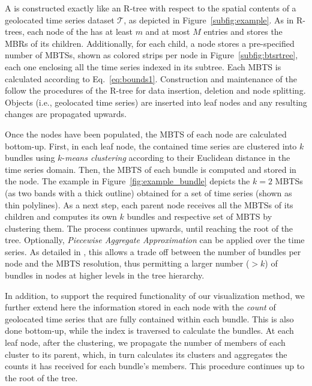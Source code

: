 A \btsr is constructed exactly like an R-tree \cite{Guttman1984} with respect to the spatial contents of a geolocated time series dataset $\mathcal{T}$, as depicted in Figure~\ref{subfig:example}. As in R-trees, each node of the \btsr has at least $m$ and at most $M$ entries and stores the MBRs of its children. Additionally, for each child, a node stores a pre-specified number of MBTSs, shown as colored strips per node in Figure~\ref{subfig:btsrtree}, each one enclosing all the time series indexed in its subtree. Each MBTS is calculated according to Eq.~\ref{eq:bounds1}. Construction and maintenance of the \btsr follow the procedures of the R-tree for data insertion, deletion and node splitting. Objects (i.e., geolocated time series) are inserted into leaf nodes and any resulting changes are propagated upwards. 

Once the nodes have been populated, the MBTS of each node are calculated bottom-up. First, in each leaf node, the contained time series are clustered into $k$ bundles using $k$-{\em means clustering} according to their Euclidean distance in the time series domain. Then, the MBTS of each bundle is computed and stored in the node. The example in Figure~\ref{fig:example_bundle} depicts the $k=2$ MBTSs (as two bands with a thick outline) obtained for a set of time series (shown as thin polylines). As a next step, each parent node receives all the MBTSs of its children and computes its own $k$ bundles and respective set of MBTS by clustering them. The process continues upwards, until reaching the root of the tree. Optionally, \emph{Piecewise Aggregate Approximation} \cite{keogh2001paa,faloutsos2000vldb} can be applied over the time series. As detailed in \cite{chatzig17btsr}, this allows a trade off between the number of bundles per node and the MBTS resolution, thus permitting a larger number ($>k$) of bundles in nodes at higher levels in the tree hierarchy. 

In addition, to support the required functionality of our visualization method, we further extend here the information stored in each node with the {\em count} of geolocated time series that are fully contained within each bundle. This is also done bottom-up, while the index is traversed to calculate the bundles. At each leaf node, after the clustering, we propagate the number of members of each cluster to its parent, which, in turn calculates its clusters and aggregates the counts it has received for each bundle's members. This procedure continues up to the root of the tree.

